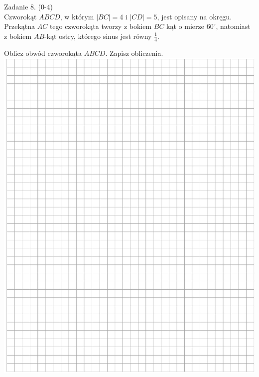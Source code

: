 \documentclass[10pt]{article}
\begin{document}
Zadanie 8. (0-4)\\
Czworokąt \(A B C D\), w którym \(|B C|=4\) i \(|C D|=5\), jest opisany na okręgu. Przekątna \(A C\) tego czworokąta tworzy z bokiem \(B C\) kąt o mierze \(60^{\circ}\), natomiast z bokiem \(A B\)-kąt ostry, którego sinus jest równy \(\frac{1}{4}\).

Oblicz obwód czworokąta \(A B C D\). Zapisz obliczenia.\\
\includegraphics[max width=\textwidth, center]{2024_11_21_f1ecc00f5c4ab21f0d04g-12}\\
\end{document}
